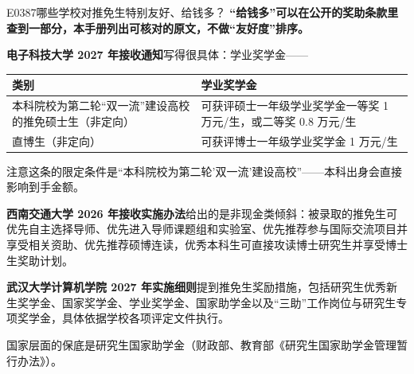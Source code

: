 \begin{qa}{E0387}{哪些学校对推免生特别友好、给钱多？}
\textbf{“给钱多”可以在公开的奖助条款里查到一部分，本手册列出可核对的原文，不做“友好度”排序。}

\textbf{电子科技大学 2027 年接收通知}写得很具体：学业奖学金——

\par\vspace{2pt}\nobreak\begin{center}\footnotesize
\begin{tabularx}{\textwidth}{>{\raggedright\arraybackslash}X>{\raggedright\arraybackslash}X}
\toprule
\textbf{类别} & \textbf{学业奖学金} \\ \midrule
本科院校为第二轮“双一流”建设高校的推免硕士生（非定向） & 可获评硕士一年级学业奖学金一等奖 1 万元/生，或二等奖 0.8 万元/生 \\
直博生（非定向） & 可获评博士一年级学业奖学金 1 万元/生 \\
\bottomrule
\end{tabularx}
\end{center}\vspace{2pt}\par

注意这条的限定条件是“本科院校为第二轮'双一流'建设高校”——本科出身会直接影响到手金额。

\textbf{西南交通大学 2026 年接收实施办法}给出的是非现金类倾斜：被录取的推免生可优先自主选择导师、优先进入导师课题组和实验室、优先推荐参与国际交流项目并享受相关资助、优先推荐硕博连读，优秀本科生可直接攻读博士研究生并享受博士生奖助计划。

\textbf{武汉大学计算机学院 2027 年实施细则}提到推免生奖励措施，包括研究生优秀新生奖学金、国家奖学金、学业奖学金、国家助学金以及“三助”工作岗位与研究生专项奖学金，具体依据学校各项评定文件执行。

国家层面的保底是研究生国家助学金（财政部、教育部《研究生国家助学金管理暂行办法》）。
\end{qa}

